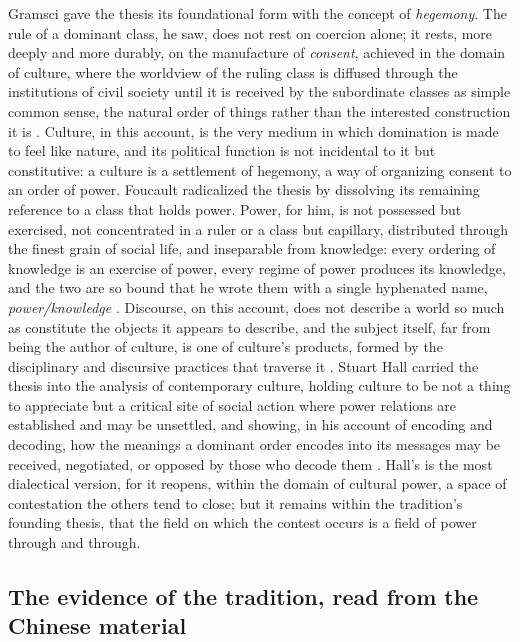 Gramsci gave the thesis its foundational form with the concept of \emph{hegemony}. The rule of a dominant class, he saw, does not rest on coercion alone; it rests, more deeply and more durably, on the manufacture of \emph{consent}, achieved in the domain of culture, where the worldview of the ruling class is diffused through the institutions of civil society until it is received by the subordinate classes as simple common sense, the natural order of things rather than the interested construction it is \parencite{gramsci1971}. Culture, in this account, is the very medium in which domination is made to feel like nature, and its political function is not incidental to it but constitutive: a culture is a settlement of hegemony, a way of organizing consent to an order of power. Foucault radicalized the thesis by dissolving its remaining reference to a class that holds power. Power, for him, is not possessed but exercised, not concentrated in a ruler or a class but capillary, distributed through the finest grain of social life, and inseparable from knowledge: every ordering of knowledge is an exercise of power, every regime of power produces its knowledge, and the two are so bound that he wrote them with a single hyphenated name, \emph{power/knowledge} \parencite{foucault1980pk}. Discourse, on this account, does not describe a world so much as constitute the objects it appears to describe, and the subject itself, far from being the author of culture, is one of culture's products, formed by the disciplinary and discursive practices that traverse it \parencite{foucault1977dp}. Stuart Hall carried the thesis into the analysis of contemporary culture, holding culture to be not a thing to appreciate but a critical site of social action where power relations are established and may be unsettled, and showing, in his account of encoding and decoding, how the meanings a dominant order encodes into its messages may be received, negotiated, or opposed by those who decode them \parencite{hall1980encoding}. Hall's is the most dialectical version, for it reopens, within the domain of cultural power, a space of contestation the others tend to close; but it remains within the tradition's founding thesis, that the field on which the contest occurs is a field of power through and through.

\subsection*{The evidence of the tradition, read from the Chinese material}

